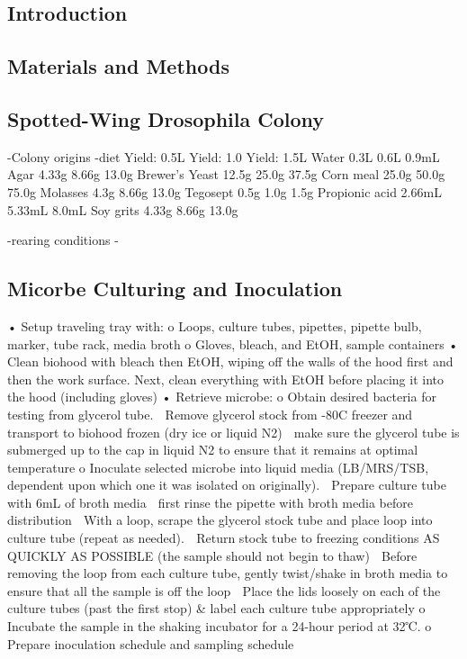 \documentclass[review]{elsarticle}
\begin{document}
\linenumbers
\begin{Introduction}
\section{Introduction}
\end{Introduction}

\begin{Materials and Methods}
\section{Materials and Methods}
\subsection{Spotted-Wing Drosophila Colony}
-Colony origins
-diet
Yield: 0.5L	Yield: 1.0	Yield: 1.5L
Water	0.3L	0.6L	0.9mL
Agar	4.33g	8.66g	13.0g
Brewer’s Yeast	12.5g	25.0g	37.5g
Corn meal	25.0g	50.0g	75.0g
Molasses	4.3g	8.66g	13.0g
Tegosept	0.5g	1.0g	1.5g
Propionic acid	2.66mL	5.33mL	8.0mL
Soy grits	4.33g	8.66g	13.0g


-rearing conditions
-
\subsection{Micorbe Culturing and Inoculation}
•	Setup traveling tray with:
o	Loops, culture tubes, pipettes, pipette bulb, marker, tube rack, media broth
o	Gloves, bleach, and EtOH, sample containers
•	Clean biohood with bleach then EtOH, wiping off the walls of the hood first and then the work surface. Next, clean everything with EtOH before placing it into the hood (including gloves)
•	Retrieve microbe:
o	Obtain desired bacteria for testing from glycerol tube.
	Remove glycerol stock from -80C freezer and transport to biohood frozen (dry ice or liquid N2)  make sure the glycerol tube is submerged up to the cap in liquid N2 to ensure that it remains at optimal temperature
o	Inoculate selected microbe into liquid media (LB/MRS/TSB, dependent upon which one it was isolated on originally). 
	Prepare culture tube with 6mL of broth media  first rinse the pipette with broth media before distribution 
	With a loop, scrape the glycerol stock tube and place loop into culture tube (repeat as needed).
	Return stock tube to freezing conditions AS QUICKLY AS POSSIBLE (the sample should not begin to thaw) 
	Before removing the loop from each culture tube, gently twist/shake in broth media to ensure that all the sample is off the loop
	Place the lids loosely on each of the culture tubes (past the first stop) & label each culture tube appropriately 
o	Incubate the sample in the shaking incubator for a 24-hour period at 32℃.
o	Prepare inoculation schedule and sampling schedule


\end{Materials and Methods}
\end{document}
